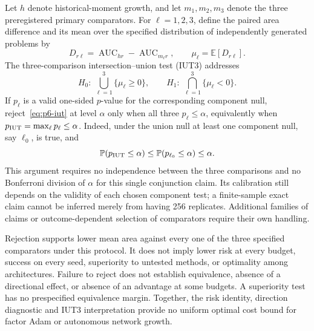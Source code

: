 Let $h$ denote historical-moment growth, and let $m_1,m_2,m_3$ denote
the three preregistered primary comparators. For $\ell=1,2,3$, define
the paired area difference and its mean over the specified distribution
of independently generated problems by
\[
 D_{r\ell}=\operatorname{AUC}_{hr}
                -\operatorname{AUC}_{m_\ell r},
 \qquad \mu_\ell=\mathbb E[D_{r\ell}].
\]
The three-comparison intersection--union test (IUT3) addresses
\begin{equation}
 H_0:\ \bigcup_{\ell=1}^3\{\mu_\ell\ge0\},
 \qquad
 H_1:\ \bigcap_{\ell=1}^3\{\mu_\ell<0\}.
 \label{eq:p6-iut}
\end{equation}
If $p_\ell$ is a valid one-sided $p$-value for the corresponding
component null, reject~\eqref{eq:p6-iut} at level $\alpha$ only when
all three $p_\ell\le\alpha$, equivalently when
$p_{\rm IUT}=\max_\ell p_\ell\le\alpha$.
Indeed, under the union null at least one component null, say
$\ell_0$, is true, and
\[
 \mathbb P(p_{\rm IUT}\le\alpha)
 \le\mathbb P(p_{\ell_0}\le\alpha)\le\alpha.
\]
This argument requires no independence between the three comparisons
and no Bonferroni division of $\alpha$ for this single conjunction
claim. Its calibration still depends on the validity of each chosen
component test; a finite-sample exact claim cannot be inferred merely
from having 256 replicates. Additional families of claims or
outcome-dependent selection of comparators require their own handling.

Rejection supports lower mean area against every one of the three
specified comparators under this protocol. It does not imply lower
risk at every budget, success on every seed, superiority to untested
methods, or optimality among architectures. Failure to reject does
not establish equivalence, absence of a directional effect, or absence
of an advantage at some budgets. A superiority test has no prespecified
equivalence margin. Together, the risk identity, direction diagnostic
and IUT3 interpretation provide no uniform optimal cost bound for
factor Adam or autonomous network growth.
